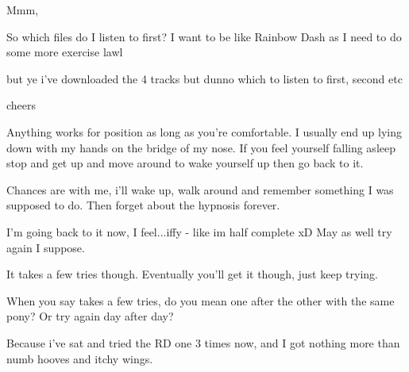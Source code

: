 \documentclass[ebook,12pt,oneside,openany]{memoir}
\newcommand{\mytexttilde}{\raisebox{0.5ex}{\texttildelow}}
\begin{document}
\begin{tcolorbox}[title=\mytexttilde{}Chaotic Parsley\mytexttilde{},colback=cyan!5!white,colframe=cyan!75!black,coltitle=white]
\par{Mmm,}
\newline{}
\par{So which files do I listen to first? I want to be like Rainbow Dash as I need to do some more exercise lawl }
\newline{}
\par{but ye i've downloaded the 4 tracks but dunno which to listen to first, second etc}
\newline{}
\par{cheers}
\end{tcolorbox}
\begin{tcolorbox}[title=Agent505,colback=pink!5!white,colframe=pink!75!black,coltitle=white]
\begin{tcolorbox}[title=yourmomsponies]
\par{Anything works for position as long as you're comfortable. I usually end up lying down with my hands on the bridge of my nose.  If you feel yourself falling asleep stop and get up and move around to wake yourself up then go back to it.}
\end{tcolorbox}
 \par{Chances are with me, i'll wake up, walk around and remember something I was supposed to do. Then forget about the hypnosis forever. }
\par{I'm going back to it now, I feel...iffy - like im half complete xD May as well try again I suppose.}
\newline{}
\newline{}
\newline{}
\begin{tcolorbox}[title=\mytexttilde{}Chaotic Aeternae Salvtis\mytexttilde{}]
\par{It takes a few tries though. Eventually you'll get it though, just keep trying.}
\end{tcolorbox}
\par{When you say takes a few tries, do you mean one after the other with the same pony? Or try again day after day?}
\par{Because i've sat and tried the RD one 3 times now, and I got nothing more than numb hooves and itchy wings.  }
\end{tcolorbox}
\end{document}
